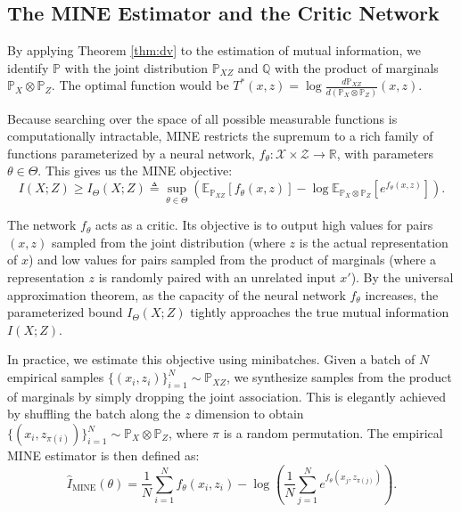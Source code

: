 \subsection{The MINE Estimator and the Critic Network}

By applying Theorem \ref{thm:dv} to the estimation of mutual information, we identify $\mathbb{P}$ with the joint distribution $\mathbb{P}_{XZ}$ and $\mathbb{Q}$ with the product of marginals $\mathbb{P}_X \otimes \mathbb{P}_Z$. The optimal function would be $T^*(x,z) = \log \frac{d\mathbb{P}_{XZ}}{d(\mathbb{P}_X \otimes \mathbb{P}_Z)}(x,z)$. 

Because searching over the space of all possible measurable functions is computationally intractable, MINE restricts the supremum to a rich family of functions parameterized by a neural network, $f_\theta: \mathcal{X} \times \mathcal{Z} \to \mathbb{R}$, with parameters $\theta \in \Theta$. This gives us the MINE objective:
\begin{equation}
\label{eq:mine_objective}
    I(X; Z) \geq I_{\Theta}(X; Z) \triangleq \sup_{\theta \in \Theta} \left( \mathbb{E}_{\mathbb{P}_{XZ}}[f_\theta(x,z)] - \log \mathbb{E}_{\mathbb{P}_X \otimes \mathbb{P}_Z}[e^{f_\theta(x,z)}] \right).
\end{equation}

The network $f_\theta$ acts as a critic. Its objective is to output high values for pairs $(x, z)$ sampled from the joint distribution (where $z$ is the actual representation of $x$) and low values for pairs sampled from the product of marginals (where a representation $z$ is randomly paired with an unrelated input $x'$). By the universal approximation theorem, as the capacity of the neural network $f_\theta$ increases, the parameterized bound $I_{\Theta}(X; Z)$ tightly approaches the true mutual information $I(X; Z)$.

In practice, we estimate this objective using minibatches. Given a batch of $N$ empirical samples $\{(x_i, z_i)\}_{i=1}^N \sim \mathbb{P}_{XZ}$, we synthesize samples from the product of marginals by simply dropping the joint association. This is elegantly achieved by shuffling the batch along the $z$ dimension to obtain $\{(x_i, z_{\pi(i)})\}_{i=1}^N \sim \mathbb{P}_X \otimes \mathbb{P}_Z$, where $\pi$ is a random permutation. The empirical MINE estimator is then defined as:
\begin{equation}
    \widehat{I}_{\text{MINE}}(\theta) = \frac{1}{N} \sum_{i=1}^N f_\theta(x_i, z_i) - \log \left( \frac{1}{N} \sum_{j=1}^N e^{f_\theta(x_j, z_{\pi(j)})} \right).
\end{equation}

